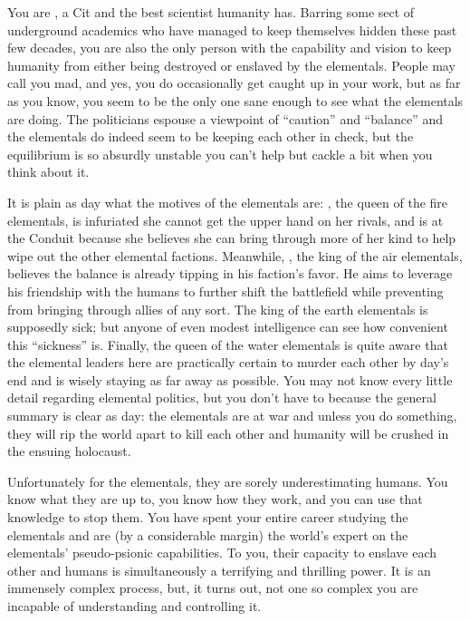 \documentclass[char]{elementals}
\begin{document}
\name{\cMS{}}

You are \cMS{\intro}, a Cit and the best scientist humanity has. Barring some sect of underground academics who have managed to keep themselves hidden these past few decades, you are also the only person with the capability and vision to keep humanity from either being destroyed or enslaved by the elementals. People may call you mad, and yes, you do occasionally get caught up in your work, but as far as you know, you seem to be the only one sane enough to see what the elementals are doing. The politicians espouse a viewpoint of ``caution'' and ``balance'' and the elementals do indeed seem to be keeping each other in check, but the equilibrium is so absurdly unstable you can't help but cackle a bit when you think about it.

It is plain as day what the motives of the elementals are: \cQueen{\intro}, the queen of the fire elementals, is infuriated she cannot get the upper hand on her rivals, and is at the Conduit because she believes she can bring through more of her kind to help wipe out the other elemental factions. Meanwhile, \cKing{\intro}, the king of the air elementals, believes the balance is already tipping in his faction's favor. He aims to leverage his friendship with the humans to further shift the battlefield while preventing \cQueen{} from bringing through allies of any sort. The king of the earth elementals is supposedly sick; but anyone of even modest intelligence can see how convenient this ``sickness'' is. Finally, the queen of the water elementals is quite aware that the elemental leaders here are practically certain to murder each other by day's end and is wisely staying as far away as possible. You may not know every little detail regarding elemental politics, but you don't have to because the general summary is clear as day: the elementals are at war and unless you do something, they will rip the world apart to kill each other and humanity will be crushed in the ensuing holocaust.

Unfortunately for the elementals, they are sorely underestimating humans. You know what they are up to, you know how they work, and you can use that knowledge to stop them. You have spent your entire career studying the elementals and are (by a considerable margin) the world's expert on the elementals' pseudo-psionic capabilities. To you, their capacity to enslave each other and humans is simultaneously a terrifying and thrilling power. It is an immensely complex process, but, it turns out, not one so complex you are incapable of understanding and controlling it. 
\end{document}
